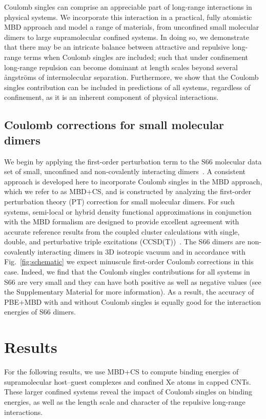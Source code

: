 \documentclass[aps,prl,groupaddress, twocolumn]{revtex4-1}  %
\begin{document}
 
Coulomb singles can comprise an appreciable part of long-range interactions in physical systems. We incorporate this interaction in a practical, fully atomistic MBD approach and model a range of materials, from unconfined small molecular dimers to large supramolecular confined systems. In doing so, we demonstrate that there may be an intricate balance between attractive and repulsive long-range terms when Coulomb singles are included; such that under confinement long-range repulsion can become dominant at length scales beyond several \r{a}ngstr\"{o}ms of intermolecular separation. 
Furthermore, we show that the Coulomb singles contribution can be included in predictions of all systems, regardless of confinement, as it is an inherent component of physical interactions. 

\subsection*{Coulomb corrections for small molecular dimers}
We begin by applying the first-order perturbation term to the S66 molecular data set of small, unconfined and non-covalently interacting dimers~\cite{s66X8_database}. A consistent approach is developed here to incorporate Coulomb singles in the MBD approach, which we refer to as MBD+CS, and is constructed by analyzing the first-order perturbation theory (PT) correction for small molecular dimers.
For such systems, semi-local or hybrid density functional approximations in conjunction with the MBD formalism are designed to provide excellent agreement with accurate reference results from the coupled cluster calculations with single, double, and perturbative triple excitations (CCSD(T))~\cite{Tkatchenko2012}.  %
The S66 dimers are
non-covalently interacting dimers in 3D isotropic vacuum and in accordance with Fig.~\ref{fig:schematic} we expect minuscule first-order Coulomb corrections in this case.
Indeed, we find that the Coulomb singles contributions for all systems in S66 are very small and they can have both positive as well as negative values (see the Supplementary Material for more information). As a result, the accuracy of PBE+MBD with and without Coulomb singles is equally good for the interaction energies of S66 dimers. %

\section*{Results}
For the following results, we use MBD+CS to compute binding energies of supramolecular host--guest complexes and confined Xe atoms in capped CNTs. These larger confined systems reveal the impact of Coulomb singles on binding energies, as well as the length scale and character of the repulsive long-range interactions.
\end{document}
